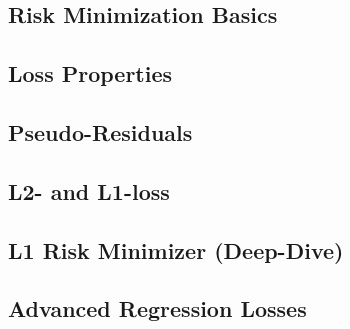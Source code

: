 

\subsection{Risk Minimization Basics}


\subsection{Loss Properties}


\subsection{Pseudo-Residuals}


\subsection{L2- and L1-loss}


\subsection{L1 Risk Minimizer (Deep-Dive)}


\subsection{Advanced Regression Losses}


